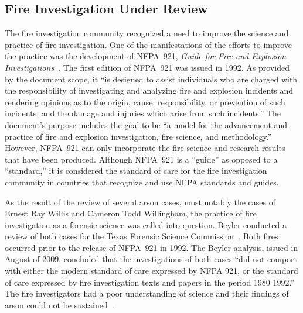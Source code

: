 \documentclass[twoside]{uocthesis}
\begin{document}
\subsection{Fire Investigation Under Review}
The fire investigation community recognized a need to improve the science and practice of fire investigation.  One of the manifestations of the efforts to improve the practice was the development of NFPA~921, {\em Guide for Fire and Explosion Investigations}~\cite{NFPA:921}.  The first edition of NFPA~921 was issued in 1992.  As provided by the document scope, it ``is designed to assist individuals who are charged with the responsibility of investigating and analyzing fire and explosion incidents and rendering opinions as to the origin, cause, responsibility, or prevention of such incidents, and the damage and injuries which arise from such incidents.'' The document’s purpose includes the goal to be ``a model for the advancement and practice of fire and explosion investigation, fire science, and methodology.'' However, NFPA~921 can only incorporate the fire science and research results that have been produced.  Although NFPA~921 is a ``guide'' as opposed to a ``standard,'' it is considered the standard of care for the fire investigation community in countries that recognize and use NFPA standards and guides.

As the result of the review of several arson cases, most notably the cases of Ernest Ray Willis and Cameron Todd Willingham, the practice of fire investigation as a forensic science was called into question.  Beyler conducted a review of both cases for the Texas Forensic Science Commission~\cite{Beyler:2009}.  Both fires occurred prior to the release of NFPA~921 in 1992.  The Beyler analysis, issued in August of 2009, concluded that the investigations of both cases ``did not comport with either the modern standard of care expressed by NFPA 921, or the standard of care expressed by fire investigation texts and papers in the period 1980 {\textendash} 1992.'' The fire investigators had a poor understanding of science and their findings of arson could not be sustained~\cite{Beyler:2009}.
\end{document}
